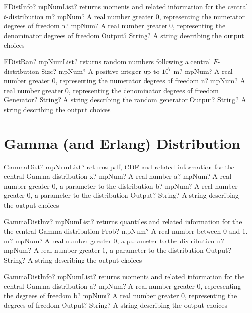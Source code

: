 \documentclass[12pt,a4paper,openany]{book}
\begin{document}
\begin{mpFunctionsExtract}
\mpFunctionThree
{FDistInfo? mpNumList? returns moments and related information for the central $t$-distribution}
{m? mpNum? A real number greater 0, representing the numerator  degrees of freedom}
{n? mpNum? A real number greater 0, representing the denominator degrees of freedom}
{Output? String? A string describing the output choices}
\end{mpFunctionsExtract}

\begin{mpFunctionsExtract}
\mpFunctionFive
{FDistRan? mpNumList? returns random numbers following a central $F$-distribution}
{Size? mpNum? A positive integer up to $10^7$}
{m? mpNum? A real number greater 0, representing the numerator  degrees of freedom}
{n? mpNum? A real number greater 0, representing the denominator degrees of freedom}
{Generator? String? A string describing the random generator}
{Output? String? A string describing the output choices}
\end{mpFunctionsExtract}

\section{Gamma (and Erlang) Distribution}

\begin{mpFunctionsExtract}
\mpFunctionFour
{GammaDist? mpNumList? returns pdf, CDF and related information for the central Gamma-distribution}
{x? mpNum? A real number}
{a? mpNum? A real number greater 0, a parameter to the distribution}
{b? mpNum? A real number greater 0, a parameter to the distribution}
{Output? String? A string describing the output choices}
\end{mpFunctionsExtract}

\begin{mpFunctionsExtract}
\mpFunctionThree
{GammaDistInv? mpNumList? returns quantiles and related information for the the central Gamma-distribution}
{Prob? mpNum? A real number between 0 and 1.}
{m? mpNum? A real number greater 0, a parameter to the distribution}
{n? mpNum? A real number greater 0, a parameter to the distribution}
{Output? String? A string describing the output choices}
\end{mpFunctionsExtract}

\begin{mpFunctionsExtract}
\mpFunctionTwo
{GammaDistInfo? mpNumList? returns moments and related information for the central Gamma-distribution}
{a? mpNum? A real number greater 0, representing the degrees of freedom}
{b? mpNum? A real number greater 0, representing the degrees of freedom}
{Output? String? A string describing the output choices}
\end{mpFunctionsExtract}
\end{document}
